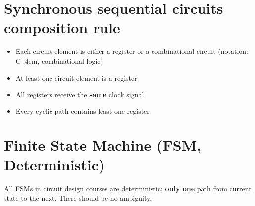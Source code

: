 \documentclass[8pt,a4paper,landscape]{extarticle}
\begin{document}
\begin{multicols*}{3}
\section*{Synchronous sequential circuits composition rule}
\begin{itemize}
\item Each circuit element is either a register or a combinational circuit (notation: C\kern-.4em\raisebox{-.3em}{L}, combinational logic)
\item At least one circuit element is a register
\item All registers receive the \textbf{same} clock signal
\item Every cyclic path contains least one register
\end{itemize}

\section*{Finite State Machine (FSM, Deterministic)}
All FSMs in circuit design courses are deterministic: \textbf{only one} path from current state to the next.
There should be no ambiguity.



\end{multicols*}
\end{document}
